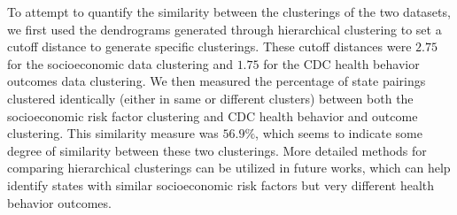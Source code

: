 \documentclass{article}
\begin{document}
To attempt to quantify the similarity between the clusterings of the two datasets, we first used the dendrograms generated through hierarchical clustering to set a cutoff distance to generate specific clusterings. These cutoff distances were $2.75$ for the socioeconomic data clustering and $1.75$ for the CDC health behavior outcomes data clustering. We then measured the percentage of state pairings clustered identically (either in same or different clusters) between both the socioeconomic risk factor clustering and CDC health behavior and outcome clustering. This similarity measure was $56.9\%$, which seems to indicate some degree of similarity between these two clusterings. More detailed methods for comparing hierarchical clusterings can be utilized in future works, which can help identify states with similar socioeconomic risk factors but very different health behavior outcomes.
\end{document}
